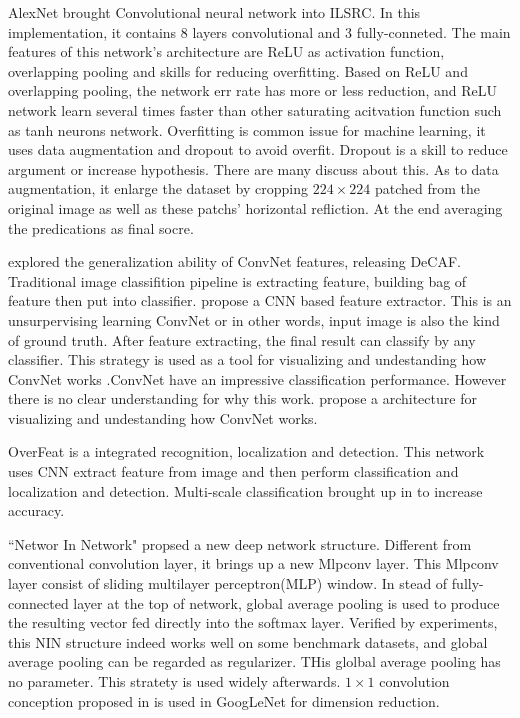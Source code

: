 \documentclass[10pt,twocolumn,letterpaper]{article}
\begin{document}
\par
AlexNet\cite{krizhevsky2012imagenet} brought Convolutional neural network into ILSRC. In this implementation, it contains 8 layers  convolutional and 3 fully-conneted. The main features of this network's architecture are ReLU\cite{nair2010rectified} as activation function, overlapping pooling and skills for reducing overfitting. Based on ReLU and overlapping pooling, the network err rate has more or less reduction, and ReLU network learn several times faster than other saturating acitvation function such as tanh neurons network. Overfitting is common issue for machine learning, it uses data augmentation and dropout to avoid overfit. Dropout is a skill to reduce argument or increase hypothesis. There are many discuss about this. As to data augmentation, it enlarge the dataset by cropping $224\times 224$ patched from the original image as well as these patchs' horizontal refliction. At the end averaging the predications as final socre.
\par
\cite{donahue2014decaf} explored the generalization ability of ConvNet features, releasing DeCAF. Traditional image classifition pipeline is extracting feature, building bag of feature then put into classifier. \cite{zeiler2011adaptive} propose a CNN based feature extractor. This is an unsurpervising learning ConvNet or in other words, input image is also the kind of ground truth. After feature extracting, the final result can classify by any classifier. This strategy is used as a tool for visualizing and undestanding how ConvNet works \cite{zeiler2014visualizing}.ConvNet have an impressive classification performance. However there is no clear understanding for why this work. \cite{zeiler2014visualizing} propose a architecture for visualizing and undestanding how ConvNet works.
\par
OverFeat\cite{sermanet2013overfeat} is a integrated recognition, localization and detection. This network uses CNN extract feature from image and then perform classification and localization and detection. Multi-scale classification brought up in \cite{sermanet2013overfeat} to increase accuracy.
\par
``Networ In Network"\cite{lin2013network} propsed a new deep network structure. Different from conventional convolution layer, it brings up a new Mlpconv layer. This Mlpconv layer consist of sliding multilayer perceptron(MLP) window. In stead of fully-connected layer at the top of network, global average pooling is used to produce the resulting vector fed directly into the softmax layer. Verified by experiments, this NIN structure indeed works well on some benchmark datasets, and global average pooling can be regarded as regularizer. THis glolbal average pooling has no parameter. This stratety is used widely afterwards. $1\times 1$ convolution conception proposed in \cite{lin2013network} is used in GoogLeNet for dimension reduction.
\end{document}
